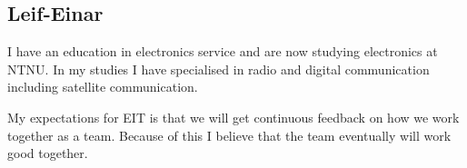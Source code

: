 \subsection{Leif-Einar}
I have an education in electronics service and are now studying electronics at NTNU. In my studies I have specialised in radio and digital communication including satellite communication. 

My expectations for EIT is that we will get continuous feedback on how we work together as a team. Because of this I believe that the team eventually will work good together.